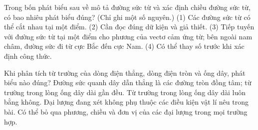 \begin{ex}
Trong bốn phát biểu sau về mô tả đường sức từ và xác định chiều đường sức từ, có bao nhiêu phát biểu đúng? (Chỉ ghi một số nguyên.) (1) Các đường sức từ có thể cắt nhau tại một điểm. (2) Cần đọc đúng dữ kiện và giả thiết. (3) Tiếp tuyến với đường sức từ tại một điểm cho phương của vectơ cảm ứng từ; bên ngoài nam châm, đường sức đi từ cực Bắc đến cực Nam. (4) Có thể thay số trước khi xác định công thức.
\end{ex}

\begin{ex}
Khi phân tích từ trường của dòng điện thẳng, dòng điện tròn và ống dây, phát biểu nào đúng?
\choice
{\True Đường sức quanh dây dẫn thẳng là các đường tròn đồng tâm; từ trường trong lòng ống dây dài gần đều.}
{Từ trường trong lòng ống dây dài luôn bằng không.}
{Đại lượng đang xét không phụ thuộc các điều kiện vật lí nêu trong bài.}
{Có thể bỏ qua phương, chiều và đơn vị của các đại lượng trong mọi trường hợp.}
\end{ex}

